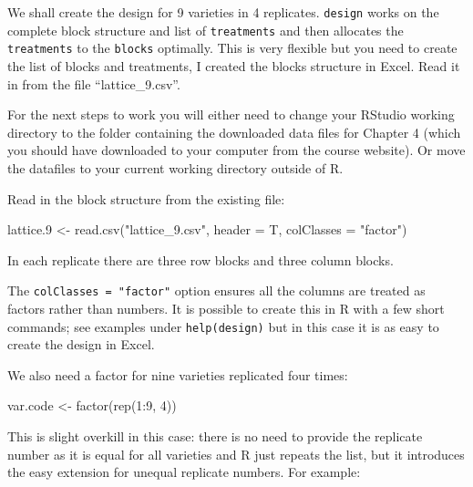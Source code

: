 \documentclass[
]{book}
\makeatletter
\newenvironment{Shaded}{\begin{snugshade}}{\end{snugshade}}
\newcommand{\AttributeTok}[1]{\textcolor[rgb]{0.77,0.63,0.00}{#1}}
\newcommand{\DecValTok}[1]{\textcolor[rgb]{0.00,0.00,0.81}{#1}}
\newcommand{\FloatTok}[1]{\textcolor[rgb]{0.00,0.00,0.81}{#1}}
\newcommand{\FunctionTok}[1]{\textcolor[rgb]{0.00,0.00,0.00}{#1}}
\newcommand{\NormalTok}[1]{#1}
\newcommand{\OtherTok}[1]{\textcolor[rgb]{0.56,0.35,0.01}{#1}}
\newcommand{\SpecialCharTok}[1]{\textcolor[rgb]{0.00,0.00,0.00}{#1}}
\newcommand{\StringTok}[1]{\textcolor[rgb]{0.31,0.60,0.02}{#1}}
\newenvironment{kframe}{%
\medskip{}
\setlength{\fboxsep}{.8em}
 \def\at@end@of@kframe{}%
 \ifinner\ifhmode%
  \def\at@end@of@kframe{\end{minipage}}%
  \begin{minipage}{\columnwidth}%
 \fi\fi%
 \def\FrameCommand##1{\hskip\@totalleftmargin \hskip-\fboxsep
 \colorbox{shadecolor}{##1}\hskip-\fboxsep
     \hskip-\linewidth \hskip-\@totalleftmargin \hskip\columnwidth}%
 \MakeFramed {\advance\hsize-\width
   \@totalleftmargin\z@ \linewidth\hsize
   \@setminipage}}%
 {\par\unskip\endMakeFramed%
 \at@end@of@kframe}
\newenvironment{rmdblock}[1]
  {
  \begin{itemize}
  \renewcommand{\labelitemi}{
    \raisebox{-.7\height}[0pt][0pt]{
      {\setkeys{Gin}{width=3em,keepaspectratio}\texttt{[image: images/\#1]}}
    }
  }
  \setlength{\fboxsep}{1em}
  \begin{kframe}
  \item
  }
  {
  \end{kframe}
  \end{itemize}
  }
\newenvironment{rmdimportant}
  {\begin{rmdblock}{important}}
  {\end{rmdblock}}
\makeatother
\begin{document}
We shall create the design for 9 varieties in 4 replicates. \texttt{design} works on the complete block structure and list of \texttt{treatments} and then allocates the \texttt{treatments} to the \texttt{blocks} optimally. This is very flexible but you need to create the list of blocks and treatments, I created the blocks structure in Excel. Read it in from the file ``lattice\_9.csv''.

\begin{rmdimportant}
For the next steps to work you will either need to change your RStudio working directory to the folder containing the downloaded data files for Chapter 4 (which you should have downloaded to your computer from the course website). Or move the datafiles to your current working directory outside of R.
\end{rmdimportant}

Read in the block structure from the existing file:

\begin{Shaded}
\begin{Highlighting}[]
\NormalTok{lattice}\FloatTok{.9} \OtherTok{\textless{}{-}} \FunctionTok{read.csv}\NormalTok{(}\StringTok{"lattice\_9.csv"}\NormalTok{, }\AttributeTok{header =}\NormalTok{ T, }\AttributeTok{colClasses =} \StringTok{"factor"}\NormalTok{)}
\end{Highlighting}
\end{Shaded}

In each replicate there are three row blocks and three column blocks.

The \texttt{colClasses\ =\ "factor"} option ensures all the columns are treated as factors rather than numbers. It is possible to create this in R with a few short commands; see examples under \texttt{help(design)} but in this case it is as easy to create the design in Excel.

We also need a factor for nine varieties replicated four times:

\begin{Shaded}
\begin{Highlighting}[]
\NormalTok{var.code }\OtherTok{\textless{}{-}} \FunctionTok{factor}\NormalTok{(}\FunctionTok{rep}\NormalTok{(}\DecValTok{1}\SpecialCharTok{:}\DecValTok{9}\NormalTok{, }\DecValTok{4}\NormalTok{))}
\end{Highlighting}
\end{Shaded}

This is slight overkill in this case: there is no need to provide the replicate number as it is equal for all varieties and R just repeats the list, but it introduces the easy extension for unequal replicate numbers. For example:
\end{document}

